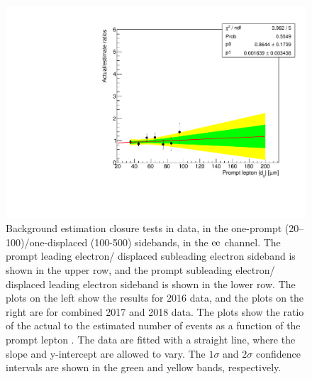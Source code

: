 \begin{figure}[hbtp]
\includegraphics[scale=0.35]{figures/bg/ee_data_2017_2018_displacedLeading_ratiosVsPromptD0.pdf}
\caption{Background estimation closure tests in data, in the one-prompt (20--100\mum)/one-displaced (100-500\mum) sidebands, in the $\mathrm{e}\mathrm{e}$ channel. The prompt leading electron/ displaced subleading electron sideband is shown in the upper row, and the prompt subleading electron/ displaced leading electron sideband is shown in the lower row. The plots on the left show the results for 2016 data, and the plots on the right are for combined 2017 and 2018 data. The plots show the ratio of the actual to the estimated number of events as a function of the prompt lepton \ad. The data are fitted with a straight line, where the slope and y-intercept are allowed to vary. The $1\sigma$ and $2\sigma$ confidence intervals are shown in the green and yellow bands, respectively.}
\label{100to500um_fits_ee}
\end{figure}


